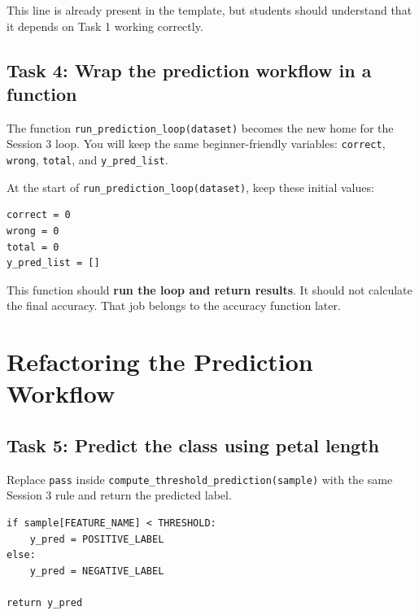 This line is already present in the template, but students should understand that it depends on Task 1 working correctly.

\subsection{Task 4: Wrap the prediction workflow in a function}

\begin{tcolorbox}[title={Entry to Task 4 until Task 9: Run the same prediction loop from Session 3, Wrap the prediction workflow in a function}]
The function \texttt{run\_prediction\_loop(dataset)} becomes the new home for the Session 3 loop. You will keep the same beginner-friendly variables: \texttt{correct}, \texttt{wrong}, \texttt{total}, and \texttt{y\_pred\_list}.
\end{tcolorbox}

At the start of \texttt{run\_prediction\_loop(dataset)}, keep these initial values:

\begin{verbatim}
correct = 0
wrong = 0
total = 0
y_pred_list = []
\end{verbatim}

\begin{tcolorbox}[title=Good Practice]
This function should \textbf{run the loop and return results}. It should not calculate the final accuracy. That job belongs to the accuracy function later.
\end{tcolorbox}

\section{Refactoring the Prediction Workflow}

\subsection{Task 5: Predict the class using petal length}

\begin{tcolorbox}[title=Task 5: Predict the class using petal length]
Replace \texttt{pass} inside \texttt{compute\_threshold\_prediction(sample)} with the same Session 3 rule and return the predicted label.
\end{tcolorbox}

\begin{verbatim}
if sample[FEATURE_NAME] < THRESHOLD:
    y_pred = POSITIVE_LABEL
else:
    y_pred = NEGATIVE_LABEL

return y_pred
\end{verbatim}

